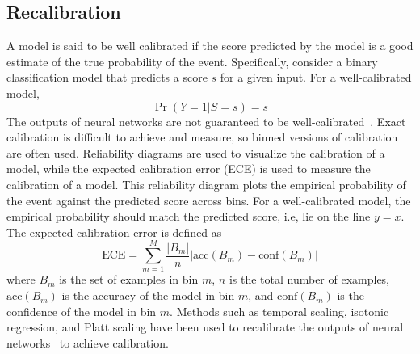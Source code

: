 
\subsection{Recalibration}
A model is said to be well calibrated if the score predicted by the model is a good estimate of the true probability of the event.
Specifically, consider a binary classification model that predicts a score $s$ for a given input.
For a well-calibrated model, 
\[
    \Pr(Y = 1 | S = s) = s
\]
The outputs of neural networks are not guaranteed to be well-calibrated~\citep{guo2017calibration}.
Exact calibration is difficult to achieve and measure, so binned versions of calibration are often used.
Reliability diagrams are used to visualize the calibration of a model, while the expected calibration error (ECE) is used to measure the calibration of a model.
This reliability diagram plots the empirical probability of the event against the predicted score across bins.
For a well-calibrated model, the empirical probability should match the predicted score, i.e, lie on the line $y = x$.
The expected calibration error is defined as
\[
    \text{ECE} = \sum_{m=1}^{M} \frac{|B_m|}{n} \left| \text{acc}(B_m) - \text{conf}(B_m) \right|
\]
where $B_m$ is the set of examples in bin $m$, $n$ is the total number of examples, $\text{acc}(B_m)$ is the accuracy of the model in bin $m$, and $\text{conf}(B_m)$ is the confidence of the model in bin $m$.
Methods such as temporal scaling, isotonic regression, and Platt scaling have been used to recalibrate the outputs of neural networks~\cite{guo2017calibration} to achieve calibration.

